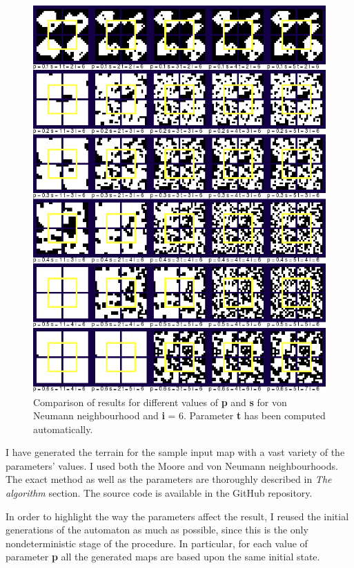 \documentclass[a4paper, 11pt]{article} %
\begin{document}
\begin{figure}[ht]
        \centering
        \includegraphics[width=1.\textwidth]{neumann_sp}
	\caption{Comparison of results for different values of \textbf{p} and \textbf{s} for von Neumann neighbourhood and \textbf{i} = 6. Parameter \textbf{t} has been computed automatically.}
	\label{fig:results4}
\end{figure}

I have generated the terrain for the sample input map with a vast variety of the parameters' values. I used both the Moore and von Neumann neighbourhoods. The exact method as well as the parameters are thoroughly described in \emph{The algorithm} section. The source code is available in the GitHub repository.\cite{repo}

In order to highlight the way the parameters affect the result, I reused the initial generations of the automaton as much as possible, since this is the only nondeterministic stage of the procedure. In particular, for each value of parameter \textbf{p} all the generated maps are based upon the same initial state.
\end{document}
